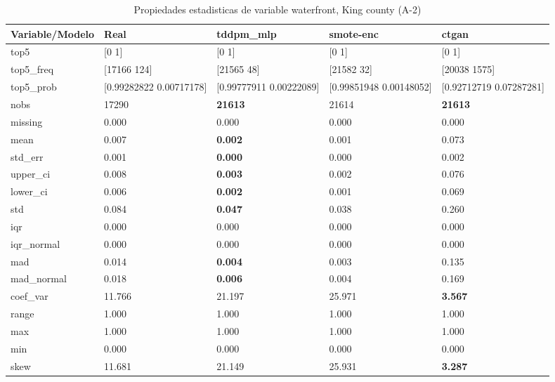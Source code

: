 \begin{table}[H]
\centering
\fontsize{8}{14}\selectfont
\caption{Propiedades  estadisticas de variable waterfront, King county (A-2)}
\label{table-stats-king county-a-2-waterfront}
\begin{tabular}{|l|m{10em}|m{10em}|m{10em}|m{10em}|}
\hline
 \rowcolor[gray]{0.8}
Variable/Modelo & Real & tddpm\_mlp & smote-enc & ctgan \\
\hline top5 & [0 1] & [0 1] & [0 1] & [0 1] \\
\hline top5\_freq & [17166   124] & [21565    48] & [21582    32] & [20038  1575] \\
\hline top5\_prob & [0.99282822 0.00717178] & [0.99777911 0.00222089] & [0.99851948 0.00148052] & [0.92712719 0.07287281] \\
\hline nobs & 17290 & \bfseries 21613 & \cellcolor[rgb]{0.9, 0.54, 0.52} 21614 & \bfseries 21613 \\
\hline missing & 0.000 & 0.000 & 0.000 & 0.000 \\
\hline mean & 0.007 & \bfseries 0.002 & 0.001 & \cellcolor[rgb]{0.9, 0.54, 0.52} 0.073 \\
\hline std\_err & 0.001 & \bfseries 0.000 & 0.000 & \cellcolor[rgb]{0.9, 0.54, 0.52} 0.002 \\
\hline upper\_ci & 0.008 & \bfseries 0.003 & 0.002 & \cellcolor[rgb]{0.9, 0.54, 0.52} 0.076 \\
\hline lower\_ci & 0.006 & \bfseries 0.002 & 0.001 & \cellcolor[rgb]{0.9, 0.54, 0.52} 0.069 \\
\hline std & 0.084 & \bfseries 0.047 & 0.038 & \cellcolor[rgb]{0.9, 0.54, 0.52} 0.260 \\
\hline iqr & 0.000 & 0.000 & 0.000 & 0.000 \\
\hline iqr\_normal & 0.000 & 0.000 & 0.000 & 0.000 \\
\hline mad & 0.014 & \bfseries 0.004 & 0.003 & \cellcolor[rgb]{0.9, 0.54, 0.52} 0.135 \\
\hline mad\_normal & 0.018 & \bfseries 0.006 & 0.004 & \cellcolor[rgb]{0.9, 0.54, 0.52} 0.169 \\
\hline coef\_var & 11.766 & 21.197 & \cellcolor[rgb]{0.9, 0.54, 0.52} 25.971 & \bfseries 3.567 \\
\hline range & 1.000 & 1.000 & 1.000 & 1.000 \\
\hline max & 1.000 & 1.000 & 1.000 & 1.000 \\
\hline min & 0.000 & 0.000 & 0.000 & 0.000 \\
\hline skew & 11.681 & 21.149 & \cellcolor[rgb]{0.9, 0.54, 0.52} 25.931 & \bfseries 3.287 \\

\end{tabular}
\end{table}
